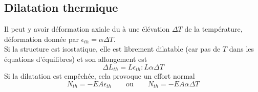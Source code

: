 	\subsection{Dilatation thermique}
	Il peut y avoir déformation axiale du à une élévation $\Delta T$ de la 
	température, déformation donnée par $\epsilon_{th} = \alpha\Delta T$. \\
	Si la structure est isostatique, elle est librement dilatable (car pas de 
	$T$ dans les équations d'équilibres) et son allongement est 
	\begin{equation}
	\Delta L_{th} = L\epsilon_{th} : L\alpha\Delta T
	\end{equation}
	Si la dilatation est empêchée, cela provoque un effort normal
	\begin{equation}
	N_{th} = -EA\epsilon_{th}\qquad\text{ou}\qquad N_{th} = -EA\alpha \Delta T
	\end{equation}